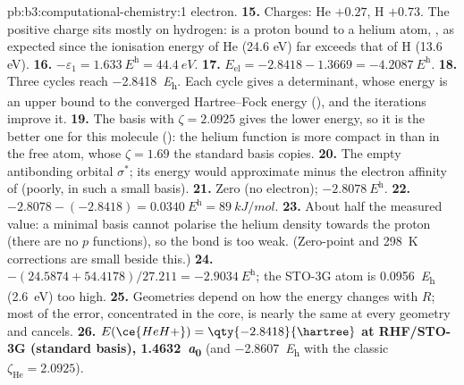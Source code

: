 \begin{solution}{pb:b3:computational-chemistry:1}
electron.
\textbf{15.} Charges: He $+0.27$, H $+0.73$. The positive charge sits mostly on
hydrogen:  is a proton bound to a helium atom, , as expected
since the ionisation energy of He (24.6 eV) far exceeds that of H (13.6 eV).
\textbf{16.} $-\varepsilon_1 = \qty{1.633}{\hartree} = \qty{44.4}{eV}$.
\textbf{17.} $E_{\mathrm{el}} = -2.8418 - 1.3669 = \qty{-4.2087}{\hartree}$.
\textbf{18.} Three cycles reach \qty{-2.8418}{\hartree}. Each cycle gives a
determinant, whose energy is an upper bound to the converged Hartree--Fock
energy (), and the iterations improve it.
\textbf{19.} The basis with $\zeta = 2.0925$ gives the lower energy, so it is the
better one for this molecule (): the helium function
is more compact in  than in the free atom, whose $\zeta = 1.69$ the
standard basis copies.
\textbf{20.} The empty antibonding orbital $\sigma^*$; its energy would approximate
minus the electron affinity of  (poorly, in such a small basis).
\textbf{21.} Zero (no electron); $\qty{-2.8078}{\hartree}$.
\textbf{22.} $-2.8078 - (-2.8418) = \qty{0.0340}{\hartree} = \qty{89}{kJ/mol}$.
\textbf{23.} About half the measured value: a minimal basis cannot polarise the
helium density towards the proton (there are no $p$ functions), so the bond
is too weak. (Zero-point and \qty{298}{K} corrections are small beside this.)
\textbf{24.} $-(24.5874 + 54.4178)/27.211 = \qty{-2.9034}{\hartree}$; the STO-3G atom
is \qty{0.0956}{\hartree} (\qty{2.6}{eV}) too high.
\textbf{25.} Geometries depend on how the energy changes with $R$; most of the
error, concentrated in the core, is nearly the same at every geometry and
cancels.
\textbf{26.} \textbf{$E(\ce{HeH+}) = \qty{-2.8418}{\hartree}$ at RHF/STO-3G (standard
basis), \qty{1.4632}{\bohr}} (and \qty{-2.8607}{\hartree} with the classic
$\zeta_{\mathrm{He}} = 2.0925$).
\end{solution}
